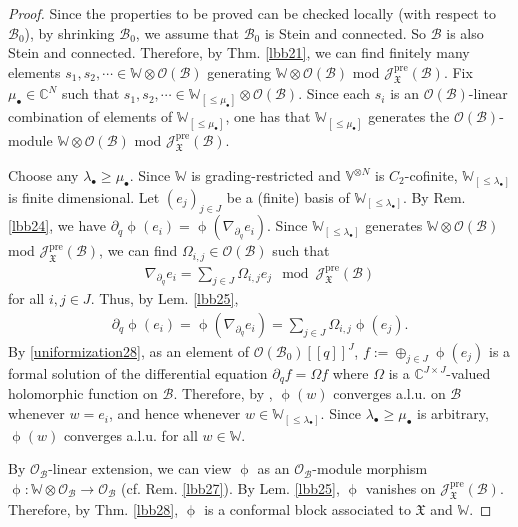 \documentclass[11pt,b5paper,notitlepage]{article}
\theoremstyle{definition}
\theoremstyle{plain}
\newcommand{\mc}{\mathcal}
\newcommand{\blt}{\bullet}
\newcommand{\Vbb}{\mathbb V}
\newcommand{\Wbb}{\mathbb W}
\newcommand{\Cbb}{\mathbb C}
\newcommand{\<}{\left\langle}
\renewcommand{\>}{\right\rangle}
\newcommand{\MO}{\mathcal{O}}
\newcommand{\MB}{\mathcal{B}}
\newcommand{\fx}{\mathfrak{X}}
\newcommand{\SJ}{\mathscr{J}}
\newcommand{\pre}{\mathrm{pre}}
\numberwithin{equation}{subsection}
\begin{document}
\begin{proof}
Since the properties to be proved can be checked locally (with respect to $\MB_0$), by shrinking $\MB_0$, we assume that $\MB_0$ is Stein and connected. So $\MB$ is also Stein and connected. Therefore, by Thm. \ref{lbb21}, we can find finitely many elements $s_1,s_2,\cdots\in \Wbb\otimes \MO(\MB)$ generating $\Wbb\otimes \MO(\MB)$ mod $\SJ_\fx^\pre(\MB)$. Fix $\mu_\blt\in \Cbb^N$ such that $s_1,s_2,\cdots\in \Wbb_{[\leq\mu_\blt]}\otimes \MO(\MB)$. Since each $s_i$ is an $\mc O(\MB)$-linear combination of elements of $\Wbb_{[\leq\mu_\blt]}$, one has that $\Wbb_{[\leq\mu_\blt]}$ generates the $\MO(\MB)$-module $\Wbb\otimes\mc O(\MB)$ mod $\SJ_\fx^\pre(\MB)$.

Choose any $\lambda_\blt\geq \mu_\blt$. Since $\Wbb$ is grading-restricted and $\Vbb^{\otimes N}$ is $C_2$-cofinite,   $\Wbb_{[\leq\lambda_\blt]}$ is finite dimensional. Let $(e_j)_{j\in J}$ be a (finite) basis of $\Wbb_{[\leq\lambda_\blt]}$. By Rem. \ref{lbb24}, we have $\partial_q \upphi(e_i)=\upphi(\nabla_{\partial_q}e_i)$. Since $\Wbb_{[\leq\lambda_\blt]}$ generates $\Wbb\otimes\mc O(\MB)$ mod $\SJ_\fx^\pre(\MB)$, we can find $\Omega_{i,j}\in \MO(\MB)$ such that
    \begin{align}
        \nabla_{\partial_q}e_i=\sum_{j\in J}\Omega_{i,j}e_{j}\mod \SJ_\fx^\pre(\MB)
    \end{align}
for all $i,j\in J$.    Thus, by Lem. \ref{lbb25},
    \begin{align}\label{uniformization28}
        \partial_q \upphi(e_i)=\upphi(\nabla_{\partial_q}e_i)=\sum_{j\in J}\Omega_{i,j}\upphi(e_{j}).
    \end{align}
By \eqref{uniformization28}, as an element of $\mc O(\MB_0)[[q]]^J$, $f:=\oplus_{j\in J}\upphi(e_j)$  is a formal solution of the differential equation $\partial_q f=\Omega f$ where $\Omega$ is a $\Cbb^{J\times J}$-valued holomorphic function on $\MB$. Therefore, by \cite[Thm. A.1]{Gui-sewingconvergence}, $\upphi(w)$ converges a.l.u. on $\MB$ whenever $w=e_i$, and hence whenever $w\in\Wbb_{[\leq\lambda_\blt]}$. Since $\lambda_\blt\geq \mu_\blt$ is arbitrary, $\upphi(w)$ converges a.l.u. for all $w\in\Wbb$. 


By $\mc O_\MB$-linear extension, we can view $\upphi$ as an $\mc O_\MB$-module morphism $\upphi:\Wbb\otimes\mc O_\MB\rightarrow\mc O_\MB$ (cf. Rem. \ref{lbb27}). By Lem. \ref{lbb25}, $\upphi$ vanishes on $\SJ_\fx^\pre(\MB)$. Therefore, by Thm. \ref{lbb28}, $\upphi$ is a conformal block associated to $\fx$ and $\Wbb$.
\end{proof}
\end{document}
